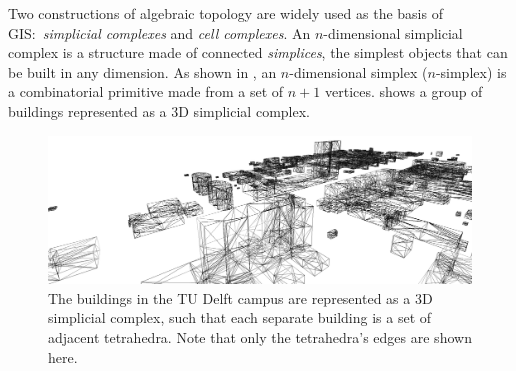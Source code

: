 Two constructions of algebraic topology are widely used as the basis of GIS:\ \emph{simplicial complexes} and \emph{cell complexes}.
An $n$-dimensional simplicial complex is a structure made of connected \emph{simplices}, the simplest objects that can be built in any dimension.
As shown in , an $n$-dimensional simplex ($n$-simplex) is a combinatorial primitive made from a set of $n+1$ vertices.
 shows a group of buildings represented as a 3D simplicial complex.
\begin{figure}[b]
\centering
\includegraphics[width=\linewidth]{figs/simplicescampus}
\caption[The TU Delft campus as a 3D simplicial complex]{The buildings in the TU Delft campus are represented as a 3D simplicial complex, such that each separate building is a set of adjacent tetrahedra. Note that only the tetrahedra's edges are shown here.}
\label{fig:simplicescampus}
\end{figure}
